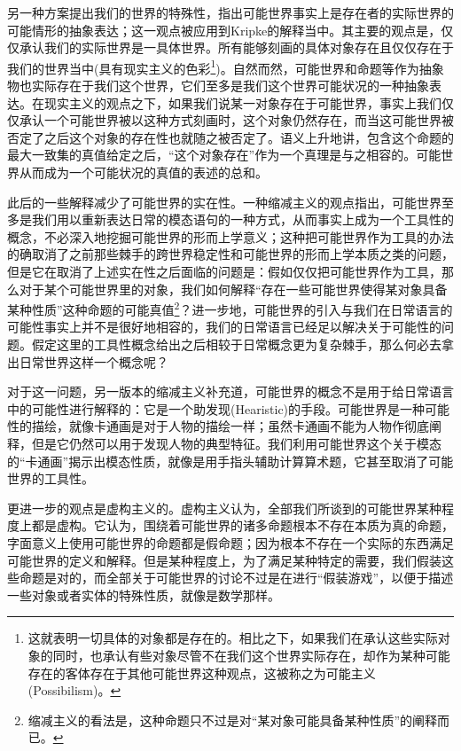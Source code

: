 \documentclass{article}
\begin{document}
另一种方案提出我们的世界的特殊性，指出可能世界事实上是存在者的实际世界的可能情形的抽象表达；这一观点被应用到Kripke的解释当中。其主要的观点是，仅仅承认我们的实际世界是一具体世界。所有能够刻画的具体对象存在且仅仅存在于我们的世界当中(具有现实主义的色彩\footnote{这就表明一切具体的对象都是存在的。相比之下，如果我们在承认这些实际对象的同时，也承认有些对象尽管不在我们这个世界实际存在，却作为某种可能存在的客体存在于其他可能世界这种观点，这被称之为可能主义(Possibilism)。})。自然而然，可能世界和命题等作为抽象物也实际存在于我们这个世界，它们至多是我们这个世界可能状况的一种抽象表达。在现实主义的观点之下，如果我们说某一对象存在于可能世界，事实上我们仅仅承认一个可能世界被以这种方式刻画时，这个对象仍然存在，而当这可能世界被否定了之后这个对象的存在性也就随之被否定了。语义上升地讲，包含这个命题的最大一致集的真值给定之后，“这个对象存在”作为一个真理是与之相容的。可能世界从而成为一个可能状况的真值的表述的总和。

此后的一些解释减少了可能世界的实在性。一种缩减主义的观点指出，可能世界至多是我们用以重新表达日常的模态语句的一种方式，从而事实上成为一个工具性的概念，不必深入地挖掘可能世界的形而上学意义；这种把可能世界作为工具的办法的确取消了之前那些棘手的跨世界稳定性和可能世界的形而上学本质之类的问题，但是它在取消了上述实在性之后面临的问题是：假如仅仅把可能世界作为工具，那么对于某个可能世界里的对象，我们如何解释“存在一些可能世界使得某对象具备某种性质”这种命题的可能真值\footnote{缩减主义的看法是，这种命题只不过是对“某对象可能具备某种性质”的阐释而已。}？进一步地，可能世界的引入与我们在日常语言的可能性事实上并不是很好地相容的，我们的日常语言已经足以解决关于可能性的问题。假定这里的工具性概念给出之后相较于日常概念更为复杂棘手，那么何必去拿出日常世界这样一个概念呢？

对于这一问题，另一版本的缩减主义补充道，可能世界的概念不是用于给日常语言中的可能性进行解释的：它是一个助发现(Hearistic)的手段。可能世界是一种可能性的描绘，就像卡通画是对于人物的描绘一样；虽然卡通画不能为人物作彻底阐释，但是它仍然可以用于发现人物的典型特征。我们利用可能世界这个关于模态的“卡通画”揭示出模态性质，就像是用手指头辅助计算算术题，它甚至取消了可能世界的工具性。

更进一步的观点是虚构主义的。虚构主义认为，全部我们所谈到的可能世界某种程度上都是虚构。它认为，围绕着可能世界的诸多命题根本不存在本质为真的命题，字面意义上使用可能世界的命题都是假命题；因为根本不存在一个实际的东西满足可能世界的定义和解释。但是某种程度上，为了满足某种特定的需要，我们假装这些命题是对的，而全部关于可能世界的讨论不过是在进行“假装游戏”，以便于描述一些对象或者实体的特殊性质，就像是数学那样。
\end{document}
